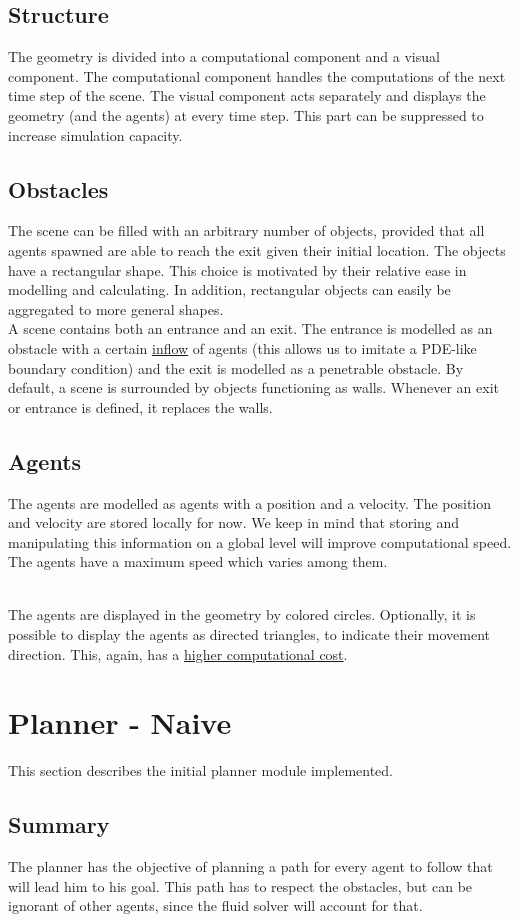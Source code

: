 \documentclass{article}
\begin{document}
\subsection{Structure}
The geometry is divided into a computational component and a visual component. The computational component handles the computations of the next time step of the scene. The visual component acts separately and displays the geometry (and the agents) at every time step. This part can be suppressed to increase simulation capacity.

\subsection{Obstacles}
The scene can be filled with an arbitrary number of objects, provided that all agents spawned are able to reach the exit given their initial location. The objects have a rectangular shape. This choice is motivated by their relative ease in modelling and calculating. In addition, rectangular objects can easily be aggregated to more general shapes.
\ \\
A scene contains both an entrance and an exit. The entrance is modelled as an obstacle with a certain \underline{inflow} of agents (this allows us to imitate a PDE-like boundary condition) and the exit is modelled as a penetrable obstacle. By default, a scene is surrounded by objects functioning as walls. Whenever an exit or entrance is defined, it replaces the walls.
\subsection{Agents}
The agents are modelled as agents with a position and a velocity. The position and velocity are stored locally for now. We keep in mind that storing and manipulating this information on a global level will improve computational speed.
The agents have a maximum speed which varies among them.

\ \\
The agents are displayed in the geometry by colored circles. Optionally, it is possible to display the agents as directed triangles, to indicate their movement direction. This, again, has a \underline{higher computational cost}.
\newpage
\section{Planner - Naive}
This section describes the initial planner module implemented.
\subsection{Summary}
The planner has the objective of planning a path for every agent to follow that will lead him to his goal. This path has to respect the obstacles, but can be ignorant of other agents, since the fluid solver will account for that.
\end{document}
